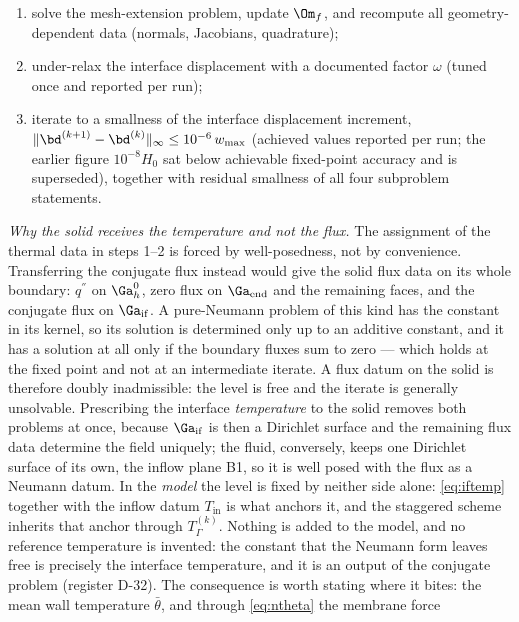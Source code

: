 \begin{enumerate}
iteration), using the temperature field $T_s^{(k)}$ of step~1. The flux balance is enforced by
alternation, exactly in the fluid subproblem at every iterate and in the solid limit;
\item solve the mesh-extension problem, update $\Om_f$, and recompute all geometry-dependent
data (normals, Jacobians, quadrature);
\item under-relax the interface displacement with a documented factor $\omega$
(tuned once and reported per run);
\item iterate to a smallness of the interface displacement increment,
$\|\bd^{(k+1)}-\bd^{(k)}\|_\infty\le10^{-6}\,w_{\max}$
(achieved values reported per run; the earlier figure $10^{-8}H_0$ sat below achievable
fixed-point accuracy and is superseded), together with residual smallness of all four
subproblem statements.
\end{enumerate}
\emph{Why the solid receives the temperature and not the flux.} The assignment of the thermal data
in steps 1--2 is forced by well-posedness, not by convenience. Transferring the conjugate flux instead would give the solid flux data on its
whole boundary: $q^{''}$ on $\Ga_h^0$, zero flux on $\Ga_{\mathrm{end}}$ and the remaining faces,
and the conjugate flux on $\Ga_{\mathrm{if}}$. A pure-Neumann problem of this kind has the constant
in its kernel, so its solution is determined only up to an additive constant, and it has a solution
at all only if the boundary fluxes sum to zero --- which holds at the fixed point and not at an
intermediate iterate. A flux datum on the solid is therefore doubly inadmissible: the level is free
and the iterate is generally unsolvable. Prescribing the interface \emph{temperature} to the solid
removes both problems at once, because $\Ga_{\mathrm{if}}$ is then a Dirichlet surface and the
remaining flux data determine the field uniquely; the fluid, conversely, keeps one Dirichlet
surface of its own, the inflow plane B1, so it is well posed with the flux as a Neumann datum.
In the \emph{model} the level is fixed by neither side alone: \eqref{eq:iftemp} together with the
inflow datum $T_{\mathrm{in}}$ is what anchors it, and the staggered scheme inherits that anchor
through $T_\Gamma^{(k)}$. Nothing is added to the model, and no reference temperature is invented:
the constant that the Neumann form leaves free is precisely the interface temperature, and it is an
output of the conjugate problem (register D-32). The consequence is worth stating where it bites:
the mean wall temperature $\bar\theta$, and through \eqref{eq:ntheta} the membrane force
